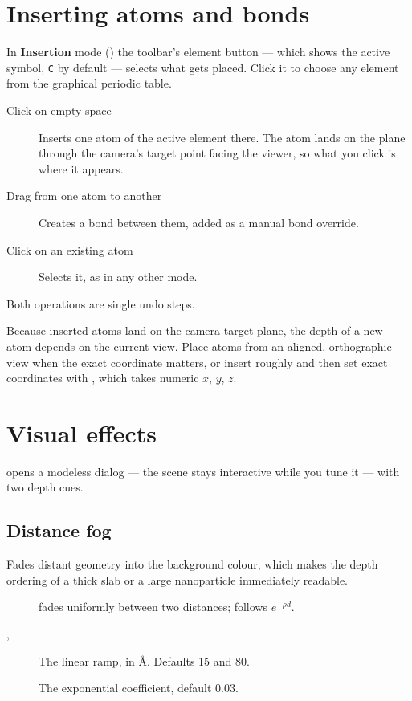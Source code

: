 \section{Inserting atoms and bonds}

In \textbf{Insertion} mode () the toolbar's element button --- which
shows the active symbol, \texttt{C} by default --- selects what gets
placed. Click it to choose any element from the graphical periodic table.

\begin{description}
  \item[Click on empty space] Inserts one atom of the active element there.
    The atom lands on the plane through the camera's target point facing
    the viewer, so what you click is where it appears.
  \item[Drag from one atom to another] Creates a bond between them, added
    as a manual bond override.
  \item[Click on an existing atom] Selects it, as in any other mode.
\end{description}

Both operations are single undo steps.

\begin{calnote}
Because inserted atoms land on the camera-target plane, the depth of a new
atom depends on the current view. Place atoms from an aligned, orthographic
view when the exact coordinate matters, or insert roughly and then set
exact coordinates with \menusep{}, which takes
numeric $x$, $y$, $z$.
\end{calnote}

\section{Visual effects}
\label{sec:visual-effects}

\menusep{} opens a modeless dialog --- the
scene stays interactive while you tune it --- with two depth cues.

\subsection{Distance fog}

Fades distant geometry into the background colour, which makes the depth
ordering of a thick slab or a large nanoparticle immediately readable.

\begin{description}
  \item[]  fades uniformly
    between two distances;  follows
    $e^{-\rho d}$.
  \item[, ] The linear ramp, in \AA{}.
    Defaults 15 and 80.
  \item[] The exponential coefficient, default 0.03.
\end{description}

